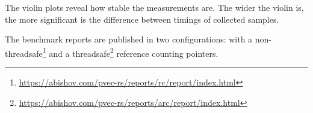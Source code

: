 The violin plots reveal how stable the measurements are. The wider the violin is, the more significant is the difference between timings of collected samples.

The benchmark reports are published in two configurations: with a non-threadsafe\footnote{\url{https://abishov.com/pvec-rs/reports/rc/report/index.html}} and a threadsafe\footnote{\url{https://abishov.com/pvec-rs/reports/arc/report/index.html}} reference counting pointers.
